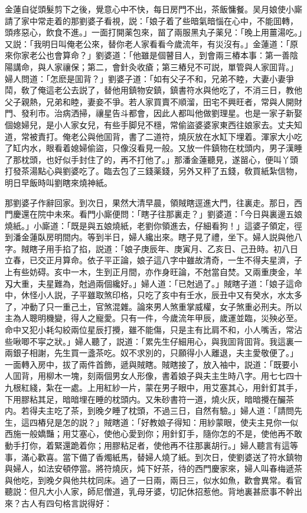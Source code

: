 金蓮自従頭髮剪下之後，覺意心中不快，每日房門不出，茶飯慵餐。吴月娘使小廝請了家中常走着的那劉婆子看視，説：「娘子着了些暗氣暗惱在心中，不能囬轉，頭疼惡心，飲食不進。」一面打開薬包來，㽞了兩服黑丸子薬兒：「晚上用薑湯吃。」又説：「我明日叫俺老公來，替你老人家看看今歲流年，有災沒有。」金蓮道：「原來你家老公也會算命？」劉婆道：「他雖是個瞽目人，到會兩三樁本事：第一善陰陽講命，與人家禳保；第二，會針灸收瘡；第三樁兒不可説，單管與人家囬背。」婦人問道：「怎麽是囬背？」劉婆子道：「如有父子不和，兄弟不睦，大妻小妻爭鬦，敎了俺這老公去説了，替他用鎮物安鎮，鎮書符水與他吃了，不消三日，教他父子親熱，兄弟和睦，妻妾不爭。若人家買賣不順溜，田宅不興旺者，常與人開財門、發利市。治病洒掃，禳星告斗都會，因此人都叫他做劉理星。也是一家子新娶個媳婦兒，是小人家女兒，有些手脚兒不穩，常偷盜婆婆家東西往娘家去。丈夫知道，常被責打。俺老公與他囬背，書了二道符，燒灰放在水缸下埋着。渾家大小吃了缸内水，眼看着媳婦偷盜，只像沒看見一般。又放一件鎮物在枕頭内，男子漢睡了那枕頭，也好似手封住了的，再不打他了。」那潘金蓮聽見，遂㽞心，便叫丫頭打發茶湯點心與劉婆吃了。臨去包了三錢薬錢，另外又秤了五錢，敎買紙紮信物，明日早飯時叫劉瞎來燒神紙。

那劉婆子作辭回家。到次日，果然大清早晨，領賊瞎逕進大門，往裏走。那日，西門慶還在院中未來。看門小廝便問：「瞎子往那裏走？」劉婆道：「今日與裏邊五娘燒紙。」小廝道：「既是與五娘燒紙，老劉你領進去，仔細看狗！」這婆子領定，徑到潘金蓮臥房明間内。等到半日，婦人纔出來。瞎子見了禮，坐下。婦人説與他八字。賊瞎子用手掐了掐，説道：「娘子庚辰年、庚寅月、乙亥日、己丑時。初八日立春，已交正月算命。依子平正論，娘子這八字中雖故清奇，一生不得夫星濟，子上有些妨碍。亥中一木，生到正月間，亦作身旺論，不尅當自焚。又兩重庚金，羊刄大重，夫星難為，尅過兩個纔好。」婦人道：「已尅過了。」賊瞎子道：「娘子這命中，休怪小人説，子平雖取煞印格，只吃了亥中有壬水，辰丑中又有癸水，水太多了，冲動了只一重己土，官煞混雜。論來男人煞重掌威權，女子煞重必刑夫。所以主為人聰明機變，得人之寵愛。只有一件，今歲流年甲辰，歲運並臨，災殃必至。命中又犯小耗勾絞兩位星辰打攪，雖不能傷，只是主有比肩不和，小人嘴舌，常沾些啾唧不寜之狀。」婦人聽了，説道：「累先生仔細用心，與我囬背囬背。我這裏一兩銀子相謝，先生買一盞茶吃。奴不求別的，只願得小人離退，夫主愛敬便了。」一面轉入房中，拔了兩件首飾，遞與賊瞎。賊瞎接了，放入袖中，説道：「既要小人囬背，用柳木一塊，刻兩個男女人形像，書着娘子與夫主生時八字。用七七四十九根紅綫，紮在一處。上用紅紗一片，蒙在男子眼中，用艾塞其心，用針釘其手，下用膠粘其足，暗暗埋在睡的枕頭内。又朱砂書符一道，燒火灰，暗暗攪在釅茶内。若得夫主吃了茶，到晚夕睡了枕頭，不過三日，自然有驗。」婦人道：「請問先生，這四樁兒是怎的説？」賊瞎道：「好教娘子得知：用紗蒙眼，使夫主見你一似西施一般嬌豔；用艾塞心，使他心愛到你；用針釘手，隨你怎的不是，使他再不敢動手打你，着緊還跪着你；用膠粘足者，使他再不往那裏胡行。」婦人聽言有這等事，滿心歡喜。當下備了香燭紙馬，替婦人燒了紙。到次日，使劉婆送了符水鎮物與婦人，如法安頓停當。將符燒灰，炖下好茶，待的西門慶家來，婦人叫春梅遞茶與他吃，到晚夕與他共枕同床。過了一日兩，兩日三，似水如魚，歡會異常。看官聽説：但凡大小人家，師尼僧道，乳母牙婆，切記休招惹他。背地裏甚麽事不幹出來？古人有四句格言説得好：

